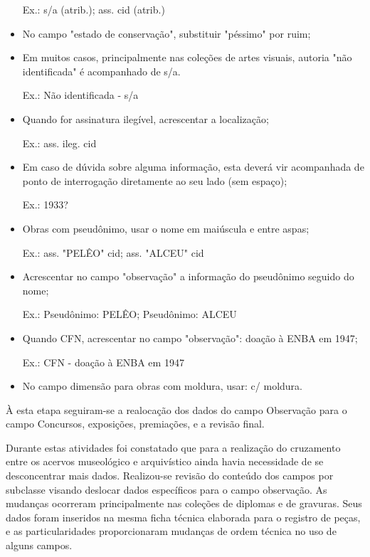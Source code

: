 \begin{itemize}
	Ex.: s/a (atrib.); ass. cid (atrib.)
	
	\item No campo "estado de conservação", substituir "péssimo" por ruim;
	
	\item Em muitos casos, principalmente nas coleções de artes visuais, autoria "não identificada" é acompanhado de s/a.
	
	Ex.: Não identificada - s/a
	
	\item Quando for assinatura ilegível, acrescentar a localização;
	
	Ex.: ass. ileg. cid
	
	\item Em caso de dúvida sobre alguma informação, esta deverá vir acompanhada de ponto de interrogação diretamente ao seu lado (sem espaço);
	
	Ex.: 1933?
	
	\item Obras com pseudônimo, usar o nome em maiúscula e entre aspas;
	
	Ex.: ass. "PELÊO" cid; ass. "ALCEU" cid
	
	\item Acrescentar no campo "observação" a informação do pseudônimo seguido do nome;
	
	Ex.: Pseudônimo: PELÊO; Pseudônimo: ALCEU
	
	\item Quando CFN, acrescentar no campo "observação": doação à ENBA em 1947;
	
	Ex.: CFN - doação à ENBA em 1947
	
	\item No campo dimensão para obras com moldura, usar: c/ moldura.
\end{itemize}

À esta etapa seguiram-se a realocação dos dados do campo Observação para o campo Concursos, exposições, premiações, e a revisão final.

Durante estas atividades foi constatado que para a realização do cruzamento entre os acervos museológico e arquivístico ainda havia necessidade de se desconcentrar mais dados. Realizou-se revisão do conteúdo dos campos por subclasse visando deslocar dados específicos para o campo observação. As mudanças ocorreram principalmente nas coleções de diplomas e de gravuras. Seus dados foram inseridos na mesma ficha técnica elaborada para o registro de peças, e as particularidades proporcionaram mudanças de ordem técnica no uso de alguns campos.

